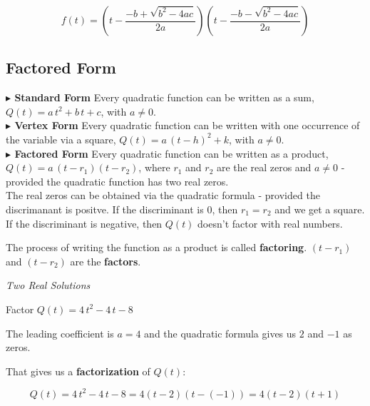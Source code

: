 \documentclass{ximera}
\begin{document}
\[ f(t) =  \left(t - \frac{-b + \sqrt{b^2 - 4 a c}}{2a}\right)   \left(t -  \frac{-b - \sqrt{b^2 - 4 a c}}{2a}\right)   \]







\subsection*{Factored Form}

\textbf{\textcolor{red!90!darkgray}{$\blacktriangleright$ Standard Form}} Every quadratic function can be written as a sum, $Q(t) = a \, t^2 + b \, t + c$, with $a \ne 0$. \\



\textbf{\textcolor{red!90!darkgray}{$\blacktriangleright$ Vertex Form}} Every quadratic function can be written with one occurrence of the variable via a square, $Q(t) = a \, (t - h)^2 + k$, with $a \ne 0$. \\



\textbf{\textcolor{red!90!darkgray}{$\blacktriangleright$ Factored Form}} Every quadratic function can be written as a product, $Q(t) = a \, (t - r_1)(t - r_2)$, where $r_1$ and $r_2$ are the real zeros and $a \ne 0$ - provided the quadratic function has two real zeros. \\





The real zeros can be obtained via the quadratic formula - provided the discrimanant is positve.  If the discriminant is $0$, then $r_1 = r_2$ and we get a square.  If the discriminant is negative, then $Q(t)$ doesn't factor with real numbers.  


The process of writing the function as a product is called \textbf{factoring}. $(t - r_1)$  and $(t - r_2)$ are the \textbf{factors}.



\begin{example} \textit{Two Real Solutions} 

Factor $Q(t) = 4 \, t^2 - 4 \, t - 8$ 

\begin{explanation}

The leading coefficient is $a=4$ and the quadratic formula gives us $2$ and $-1$ as zeros.  

That gives us a \textbf{factorization} of $Q(t)$:



\[    Q(t) = 4 \, t^2 - 4 \, t - 8 =  4 (t-2)(t-(-1))    = 4 (t-2)(t+1)         \]

\end{explanation}

\end{example}
\end{document}

